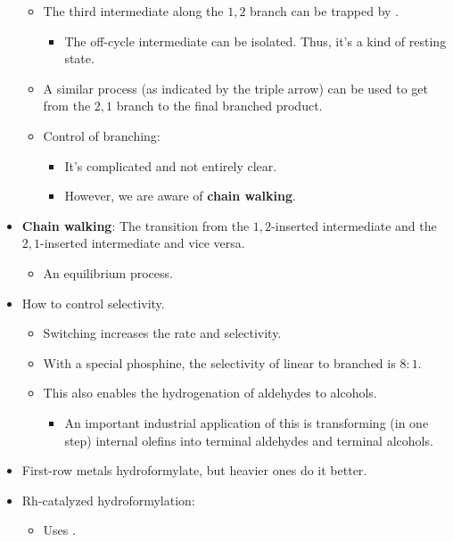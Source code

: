 \documentclass[../notes.tex]{subfiles}
\begin{document}
\begin{itemize}
\begin{itemize}
        \item The third intermediate along the $1,2$ branch can be trapped by .
        \begin{itemize}
            \item The off-cycle intermediate can be isolated. Thus, it's a kind of resting state.
        \end{itemize}
        \item A similar process (as indicated by the triple arrow) can be used to get from the $2,1$ branch to the final branched product.
        \item Control of branching:
        \begin{itemize}
            \item It's complicated and not entirely clear.
            \item However, we are aware of \textbf{chain walking}.
        \end{itemize}
    \end{itemize}
    \item \textbf{Chain walking}: The transition from the $1,2$-inserted intermediate and the $2,1$-inserted intermediate and vice versa.
    \begin{itemize}
        \item An equilibrium process.
    \end{itemize}
    \item How to control selectivity.
    \begin{itemize}
        \item Switching  increases the rate and selectivity.
        \item With a special phosphine, the selectivity of linear to branched is $8:1$.
        \item This also enables the hydrogenation of aldehydes to alcohols.
        \begin{itemize}
            \item An important industrial application of this is transforming (in one step) internal olefins into terminal aldehydes and terminal alcohols.
        \end{itemize}
    \end{itemize}
    \item First-row metals hydroformylate, but heavier ones do it better.
    \item Rh-catalyzed hydroformylation:
    \begin{itemize}
        \item Uses .

\end{itemize}
\end{itemize}
\end{document}
